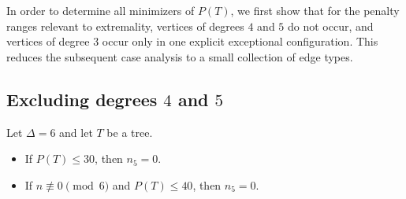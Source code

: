 \documentclass[preprint,12pt]{elsarticle}
\begin{document}
In order to determine all minimizers of $P(T)$, we first show that for the penalty
ranges relevant to extremality, vertices of degrees $4$ and $5$ do not occur, and
vertices of degree $3$ occur only in one explicit exceptional configuration.
This reduces the subsequent case analysis to a small collection of edge types.

\subsection{Excluding degrees $4$ and $5$}
\label{subsec:no45}

\begin{lemma}
\label{lem:no5-threshold}
Let $\Delta=6$ and let $T$ be a tree.
\begin{itemize}
\item If $P(T)\le 30$, then $n_5=0$.
\item If $n\not\equiv 0\pmod 6$ and $P(T)\le 40$, then $n_5=0$.
\end{itemize}
\end{lemma}
\end{document}
